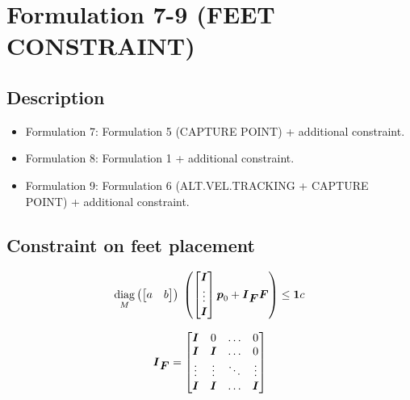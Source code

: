 \section{Formulation 7-9 (FEET CONSTRAINT)}


\subsection{Description}
\begin{itemize}
    \item Formulation 7: Formulation 5 (CAPTURE POINT) + additional constraint.
    \item Formulation 8: Formulation 1 + additional constraint.
    \item Formulation 9: Formulation 6 (ALT.VEL.TRACKING + CAPTURE POINT) + additional constraint.
\end{itemize}



\subsection{Constraint on feet placement}

\begin{equation*}
    \underset{M}{\operatorname{diag}}\left(\begin{bmatrix} a & b \end{bmatrix}\right)\;
    \left(
        \begin{bmatrix}
            \mbox{\boldmath $I$} \\
            \vdots \\
            \mbox{\boldmath $I$}\\
        \end{bmatrix} 
        \mbox{\boldmath $p$}_0
        +
        \mbox{\boldmath $I$}_{\mbox{\boldmath $F$}}
        \mbox{\boldmath $F$}
    \right)
    \le
    \mbox{\boldmath $1$} c
\end{equation*}


\begin{equation*}
    \mbox{\boldmath $I$}_{\mbox{\boldmath $F$}} =
    \begin{bmatrix}
        \mbox{\boldmath $I$}   &   0   &  \dots  &   0\\
        \mbox{\boldmath $I$}   & \mbox{\boldmath $I$} &  \dots  &   0\\
        \vdots  & \vdots&  \ddots &  \vdots\\
        \mbox{\boldmath $I$}   & \mbox{\boldmath $I$} &  \dots  &   \mbox{\boldmath $I$}\\
    \end{bmatrix}
\end{equation*}


